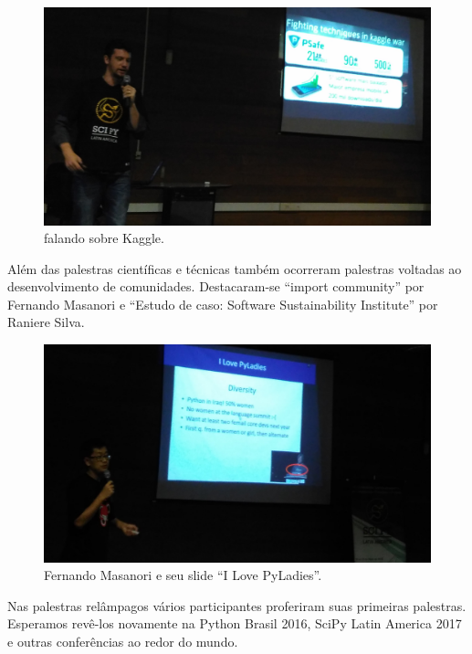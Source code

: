 \documentclass[12pt]{article}
\begin{document}
\begin{figure}[!htb]
\center
\includegraphics[height=.3\textheight]{talks-kaggle.jpg}
\caption{falando sobre Kaggle.}
\end{figure}

Além das palestras científicas e técnicas também ocorreram palestras voltadas
ao desenvolvimento de comunidades. Destacaram-se ``import community'' por
Fernando Masanori e ``Estudo de caso: Software Sustainability Institute'' por
Raniere Silva.

\begin{figure}[!htb]
\center
\includegraphics[height=.3\textheight]{talks-pyladies.jpg}
\caption{Fernando Masanori e seu slide ``I Love PyLadies''.}
\end{figure}

Nas palestras relâmpagos vários participantes proferiram suas primeiras
palestras. Esperamos revê-los novamente na Python Brasil 2016, SciPy Latin
America 2017 e outras conferências ao redor do mundo.
\end{document}
